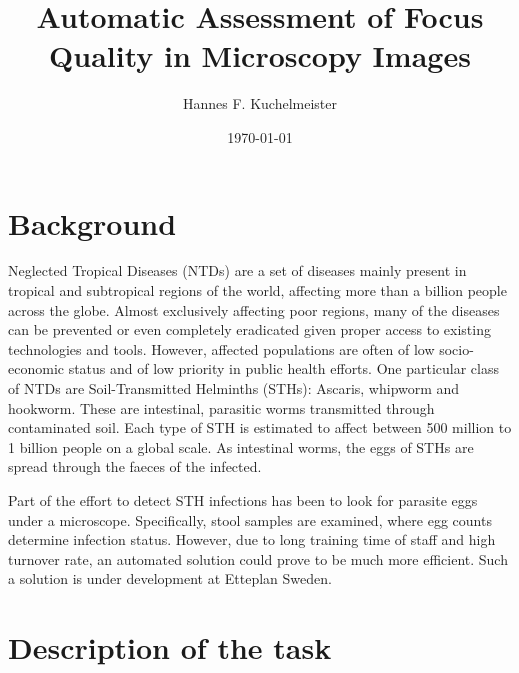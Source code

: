 \documentclass[a4paper,11pt]{article}
\title{Automatic Assessment of Focus Quality in Microscopy Images}
\author{Hannes F. Kuchelmeister}
\date{\today}
\begin{document}
\maketitle
\newpage



\section{Background}

Neglected Tropical Diseases (NTDs) are a set of diseases mainly present in tropical and subtropical regions of the world, affecting more than a billion people across the globe. Almost exclusively affecting poor regions, many of the diseases can be prevented or even completely eradicated given proper access to existing technologies and tools. However, affected populations are often of low socio-economic status and of low priority in public health efforts. One particular class of NTDs are Soil-Transmitted Helminths (STHs): Ascaris, whipworm and hookworm. These are intestinal, parasitic worms transmitted through contaminated soil. Each type of STH is estimated to affect between 500 million to 1 billion people on a global scale. As intestinal worms, the eggs of STHs are spread through the faeces of the infected. 

Part of the effort to detect STH infections has been to look for parasite eggs under a microscope. Specifically, stool samples are examined, where egg counts determine infection status. However, due to long training time of staff and high turnover rate, an automated solution could prove to be much more efficient. Such a solution is under development at Etteplan Sweden.


\section{Description of the task}

\end{document}
